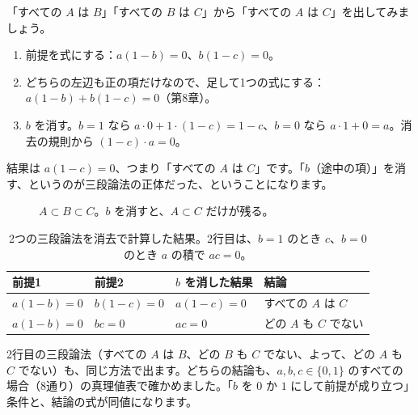 \documentclass[a4paper,11pt,openany]{ltjsbook}
\begin{document}
「すべての $A$ は $B$」「すべての $B$ は $C$」から「すべての $A$ は $C$」を出してみましょう。

\begin{enumerate}[leftmargin=*]
\item 前提を式にする：$a(1-b)=0$、$b(1-c)=0$。
\item どちらの左辺も正の項だけなので、足して1つの式にする：$a(1-b)+b(1-c)=0$（第8章）。
\item $b$ を消す。$b=1$ なら $a\cdot0+1\cdot(1-c)=1-c$、$b=0$ なら $a\cdot1+0=a$。消去の規則から $(1-c)\cdot a=0$。
\end{enumerate}

結果は $a(1-c)=0$、つまり「すべての $A$ は $C$」です。「$b$（途中の項）」を消す、というのが三段論法の正体だった、ということになります。

\begin{figure}[htbp]
\centering
{}
\caption{$A\subset B\subset C$。$b$ を消すと、$A\subset C$ だけが残る。}
\end{figure}

\begin{table}[htbp]
\centering
\begin{tabular}{llll}
\toprule
前提1 & 前提2 & $b$ を消した結果 & 結論\\
\midrule
$a(1-b)=0$ & $b(1-c)=0$ & $a(1-c)=0$ & すべての $A$ は $C$\\
$a(1-b)=0$ & $bc=0$ & $ac=0$ & どの $A$ も $C$ でない\\
\bottomrule
\end{tabular}
\caption{2つの三段論法を消去で計算した結果。2行目は、$b=1$ のとき $c$、$b=0$ のとき $a$ の積で $ac=0$。}
\end{table}

2行目の三段論法（すべての $A$ は $B$、どの $B$ も $C$ でない、よって、どの $A$ も $C$ でない）も、同じ方法で出ます。どちらの結論も、$a,b,c\in\{0,1\}$ のすべての場合（8通り）の真理値表で確かめました。「$b$ を $0$ か $1$ にして前提が成り立つ」条件と、結論の式が同値になります。
\end{document}
